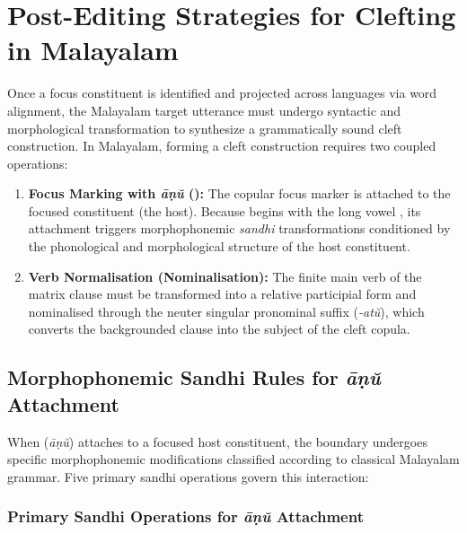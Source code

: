 \chapter{Post-Editing Strategies for Clefting in Malayalam}
\label{chap:clefting}

Once a focus constituent is identified and projected across languages via word alignment, the Malayalam target utterance must undergo syntactic and morphological transformation to synthesize a grammatically sound cleft construction. In Malayalam, forming a cleft construction requires two coupled operations:
\begin{enumerate}
    \item \textbf{Focus Marking with \textit{āṇŭ} ():} The copular focus marker  is attached to the focused constituent (the host). Because  begins with the long vowel , its attachment triggers morphophonemic \textit{sandhi} transformations conditioned by the phonological and morphological structure of the host constituent.
    \item \textbf{Verb Normalisation (Nominalisation):} The finite main verb of the matrix clause must be transformed into a relative participial form and nominalised through the neuter singular pronominal suffix  (\textit{-atŭ}), which converts the backgrounded clause into the subject of the cleft copula.
\end{enumerate}



\section{Morphophonemic Sandhi Rules for \textit{āṇŭ} Attachment}

When  (\textit{āṇŭ}) attaches to a focused host constituent, the boundary undergoes specific morphophonemic modifications classified according to classical Malayalam grammar. Five primary sandhi operations govern this interaction:

\subsection{Primary Sandhi Operations for \textit{āṇŭ} Attachment}

